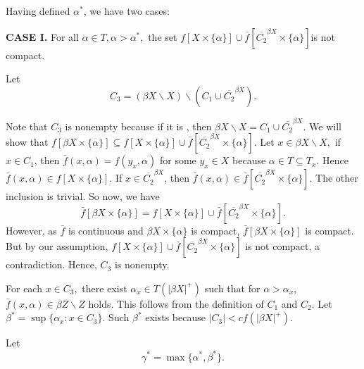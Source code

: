 \documentclass{article}
\begin{document}
Having defined $\alpha^*$, we have two cases: 

\vskip 20pt

\textbf{CASE I.} For all $\alpha \in T, \alpha>\alpha^*,$ the set $f\left[X\times\{\alpha\}\right] \cup \bar{f}\left[\overline{C_2}^{\beta X} \times \{\alpha\}\right] $is not compact. 

\vskip 20pt

Let $$C_3=(\beta X\backslash X) \backslash (C_1\cup \overline{C_2}^{\beta X}).$$

Note that $C_3$ is nonempty because if it is , then $\beta X\backslash X= C_1\cup \overline{C_2}^{\beta X}.$ We will show that $f\left[\beta X\times \{\alpha\} \right] \subseteq f\left[X\times\{\alpha\}\right]\cup\bar{f}\left[\overline{C_2}^{\beta X}\times\{\alpha\}\right].$ Let $x\in\beta X\backslash X,$ if $x\in C_1$, then $\bar{f}(x,\alpha)=f(y_x,\alpha)$ for some $y_x\in X$ because $\alpha\in T\subseteq T_x.$ Hence $\bar{f}(x,\alpha)\in f\left[X\times\{\alpha\}\right].$ If $x\in \overline{C_2}^{\beta X}$, then $\bar{f}(x,\alpha)\in \bar{f}\left[\overline{C_2}^{\beta X}\times \{\alpha\}\right].$ 
The other inclusion is trivial. So now, we have 
$$\bar{f}\left[\beta X\times \{\alpha\}\right]=f\left[X\times\{\alpha\}\right]\cup\bar{f}\left[\overline{C_2}^{\beta X} \times \{\alpha\}\right].$$
However, as $\bar{f}$ is continuous and $\beta X\times \{\alpha\}$ is compact, $\bar{f}\left[\beta X\times \{\alpha\}\right]$ is compact. But by our assumption, $f\left[X\times\{\alpha\}\right] \cup \bar{f}\left[\overline{C_2}^{\beta X} \times \{\alpha\}\right] $ is not compact, a contradiction. Hence, $C_3$ is nonempty.

\vskip 20pt


For each $x\in C_3,$ there exist $\alpha_x\in T(|\beta X|^+)$ such that for $\alpha>\alpha_x$, $\bar{f}(x,\alpha)\in \beta Z\backslash Z$ holds. This follows from the definition of $C_1$ and $C_2$. Let $\beta^*=\sup\{\alpha_x: x\in C_3\}.$ Such $\beta^*$ exists because $|C_3|<cf(|\beta X|^+).$

Let $$\gamma^*=\max\{\alpha^*, \beta^*\}.$$
\end{document}
